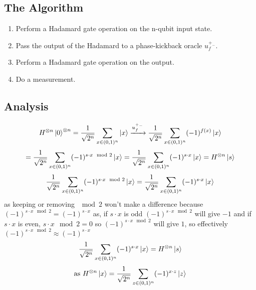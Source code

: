 \documentclass[11.5pt, paper=a4]{article}
\theoremstyle{definition}
\numberwithin{theorem}{section}
\begin{document}
\subsection{The Algorithm}
\begin{enumerate}
  \item Perform a Hadamard gate operation on the n-qubit input state.
  \item Pass the output of the Hadamard to a phase-kickback oracle $u_f^{+_-}$.
  \item Perform a Hadamard gate operation on the output.
  \item Do a measurement.
\end{enumerate}

\subsection{Analysis}
\begin{equation}
H^{\otimes n} \ket{0}^{\otimes n} = \frac{1}{\sqrt{{2^n}}} \sum\limits_{x\in (0,1)^n}\ket{x}\xrightarrow{u_f^{+_-}} \frac{1}{\sqrt{{2^n}}} \sum\limits_{x\in (0,1)^n} (-1)^{f(x)} \ket{x} 
\end{equation}
\begin{equation}
= \frac{1}{\sqrt{{2^n}}} \sum\limits_{x\in (0,1)^n} (-1)^{s\cdot x\mod 2} \ket{x}  \\[2mm] =  \frac{1}{\sqrt{{2^n}}} \sum\limits_{x\in (0,1)^n} (-1)^{s\cdot x} \ket{x} = H^{\otimes n} \ket{s}
\end{equation}
\begin{equation}
   \frac{1}{\sqrt{{2^n}}} \sum\limits_{x\in (0,1)^n} (-1)^{s\cdot x\mod 2} \ket{x}=  \frac{1}{\sqrt{{2^n}}} \sum\limits_{x\in (0,1)^n} (-1)^{s\cdot x} \ket{x} 
\end{equation}
as keeping or removing $\mod 2$ won't make a difference because $(-1)^{s\cdot x \mod 2} = (-1)^{s\cdot x}$ as, if ${s\cdot x}$ is odd $(-1)^{s\cdot x \mod 2}$ will give $-1$ and if ${s\cdot x}$ is even, ${s\cdot x \mod 2} = 0$ so $(-1)^{s\cdot x \mod 2}$ will give $1$, so effectively $(-1)^{s\cdot x \mod 2} \approx (-1)^{s\cdot x}$ \\[2mm]
\begin{equation}
  \frac{1}{\sqrt{{2^n}}} \sum\limits_{x\in (0,1)^n} (-1)^{s\cdot x} \ket{x} = H^{\otimes n} \ket{s}  
\end{equation}
\begin{equation}
    \text{as } H^{\otimes n} \ket{x} = \frac{1}{\sqrt{{2^n}}} \sum\limits_{z\in (0,1)^n} (-1)^{x\cdot z} \ket{z}
\end{equation}
\end{document}

